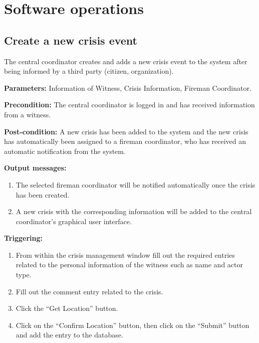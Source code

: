 \chapter{Software operations}
\label{chap:soptware_operations}


\section{Create a new crisis event}
\label{operation:MyOperation}
The central coordinator creates and adds a new crisis event to the system after
being informed by a third party (citizen, organization).

\begin{description}

\item \textbf{Parameters:} Information of Witness, Crisis Information, Fireman
Coordinator.
\item \textbf{Precondition:} The central coordinator is logged in and has
received information from a witness.
\item \textbf{Post-condition:} A new crisis has been added to the system and the
new crisis has automatically been assigned to a fireman coordinator, who has
received an automatic notification from the system.
\item \textbf{Output messages:}\begin{enumerate}\item The selected fireman
coordinator will be notified automatically once the crisis has been created.
\item A new crisis with the corresponding information will be added to the
central coordinator's graphical user interface.
\end{enumerate}

\item \textbf{Triggering:}
\begin{enumerate}
\item From within the crisis management window fill out the required entries
related to the personal information of the witness such as name and actor type.
\item Fill out the comment entry related to the crisis.
\item Click the “Get Location” button.
\item Click on the “Confirm Location” button, then click on the “Submit”
button and add the entry to the database.
\end{enumerate}

 
\end{description}

